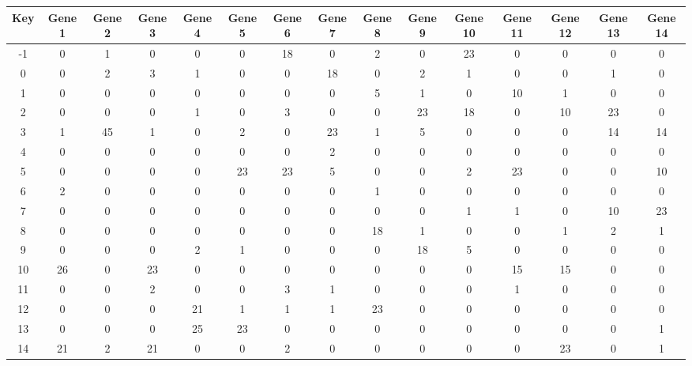\begin{tabular}{|c|c|c|c|c|c|c|c|c|c|c|c|c|c|c|}
\hline
Key & Gene 1 & Gene 2 & Gene 3 & Gene 4 & Gene 5 & Gene 6 & Gene 7 & Gene 8 & Gene 9 & Gene 10 & Gene 11 & Gene 12 & Gene 13 & Gene 14 \\
\hline
-1 & 0 & 1 & 0 & 0 & 0 & 18 & 0 & 2 & 0 & 23 & 0 & 0 & 0 & 0 \\
0 & 0 & 2 & 3 & 1 & 0 & 0 & 18 & 0 & 2 & 1 & 0 & 0 & 1 & 0 \\
1 & 0 & 0 & 0 & 0 & 0 & 0 & 0 & 5 & 1 & 0 & 10 & 1 & 0 & 0 \\
2 & 0 & 0 & 0 & 1 & 0 & 3 & 0 & 0 & 23 & 18 & 0 & 10 & 23 & 0 \\
3 & 1 & 45 & 1 & 0 & 2 & 0 & 23 & 1 & 5 & 0 & 0 & 0 & 14 & 14 \\
4 & 0 & 0 & 0 & 0 & 0 & 0 & 2 & 0 & 0 & 0 & 0 & 0 & 0 & 0 \\
5 & 0 & 0 & 0 & 0 & 23 & 23 & 5 & 0 & 0 & 2 & 23 & 0 & 0 & 10 \\
6 & 2 & 0 & 0 & 0 & 0 & 0 & 0 & 1 & 0 & 0 & 0 & 0 & 0 & 0 \\
7 & 0 & 0 & 0 & 0 & 0 & 0 & 0 & 0 & 0 & 1 & 1 & 0 & 10 & 23 \\
8 & 0 & 0 & 0 & 0 & 0 & 0 & 0 & 18 & 1 & 0 & 0 & 1 & 2 & 1 \\
9 & 0 & 0 & 0 & 2 & 1 & 0 & 0 & 0 & 18 & 5 & 0 & 0 & 0 & 0 \\
10 & 26 & 0 & 23 & 0 & 0 & 0 & 0 & 0 & 0 & 0 & 15 & 15 & 0 & 0 \\
11 & 0 & 0 & 2 & 0 & 0 & 3 & 1 & 0 & 0 & 0 & 1 & 0 & 0 & 0 \\
12 & 0 & 0 & 0 & 21 & 1 & 1 & 1 & 23 & 0 & 0 & 0 & 0 & 0 & 0 \\
13 & 0 & 0 & 0 & 25 & 23 & 0 & 0 & 0 & 0 & 0 & 0 & 0 & 0 & 1 \\
14 & 21 & 2 & 21 & 0 & 0 & 2 & 0 & 0 & 0 & 0 & 0 & 23 & 0 & 1 \\
\hline
\end{tabular}